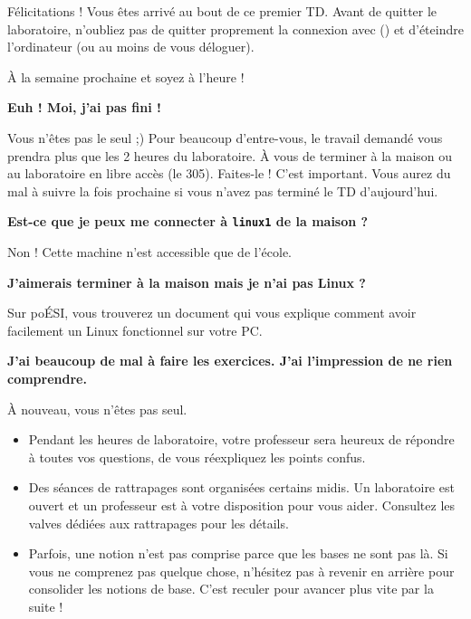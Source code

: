 \documentclass[a4paper,11pt]{style-esi/td}
\begin{document}
	\bigskip
	\begin{infotbox}{Félicitations !} 
		Vous êtes arrivé au bout de ce premier TD.
		Avant de quitter le laboratoire, n'oubliez pas de quitter proprement 
		la connexion avec  () 
		et d'éteindre l'ordinateur (ou au moins de vous déloguer).

		À la semaine prochaine et soyez à l'heure !
	\end{infotbox}

	\bigskip
	\begin{faq}
		\textbf{Euh ! Moi, j'ai pas fini !}
		
		Vous n'êtes pas le seul ;)
		Pour beaucoup d'entre-vous, 
		le travail demandé vous prendra plus que les 2 heures du laboratoire.
		À vous de terminer à la maison ou au laboratoire en libre accès (le 305).
		Faites-le ! C'est important.
		Vous aurez du mal à suivre la fois prochaine 
		si vous n'avez pas terminé le TD d'aujourd'hui.
		
		\medskip
		\textbf{Est-ce que je peux me connecter à \texttt{linux1} de la maison ?}
		
		Non ! Cette machine n'est accessible que de l'école.

		\medskip
		\textbf{J'aimerais terminer à la maison mais je n'ai pas Linux ?}
		
		Sur poÉSI, vous trouverez un document qui vous explique
		comment avoir facilement un Linux fonctionnel sur votre PC.

		\medskip
		\textbf{J'ai beaucoup de mal à faire les exercices. 
			J'ai l'impression de ne rien comprendre.}
		
		À nouveau, vous n'êtes pas seul.
		\begin{itemize}
		\item 
			Pendant les heures de laboratoire, 
			votre professeur sera heureux de répondre à toutes vos questions,
			de vous réexpliquez les points confus.
		\item 
			Des séances de rattrapages sont organisées certains midis.
			Un laboratoire est ouvert et un professeur est à votre disposition
			pour vous aider. 
			Consultez les valves dédiées aux rattrapages pour les détails.
		\item 
			Parfois, une notion n'est pas comprise 
			parce que les bases ne sont pas là.
			Si vous ne comprenez pas quelque chose,
			n'hésitez pas à revenir en arrière pour consolider les notions de base.
			C'est reculer pour avancer plus vite par la suite !
		\end{itemize}
	\end{faq}
\end{document}
